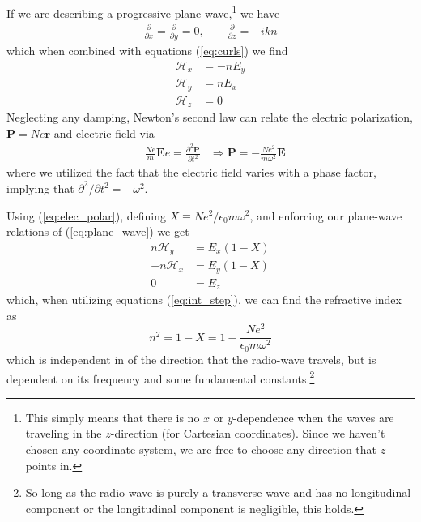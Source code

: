 \documentclass[11pt]{article}
\numberwithin{equation}{section}
\begin{document}
    If we are describing a progressive plane wave,\footnote{This simply means that there is no $x$ or $y$-dependence when the waves are traveling in the $z$-direction (for Cartesian coordinates). Since we haven't chosen any coordinate system, we are free to choose any direction that $z$ points in.} we have
    \begin{align}
         \frac{\partial}{\partial x} = \frac{\partial}{\partial y} = 0, \qquad \frac{\partial}{\partial z} = -i k n
        \label{eq:plane_wave}
    \end{align}
    which when combined with equations (\ref{eq:curls}) we find
    \begin{subequations}
     \begin{align}
        \mathcal{H}_x &= - n E_y \\
        \mathcal{H}_y & = nE_x \\
        \mathcal{H}_z & = 0
    \end{align}
    \label{eq:int_step}
    \end{subequations}
    Neglecting any damping, Newton's second law can relate the electric polarization, $\mathbf{P} = Ne\mathbf{r}$ and electric field via
    \begin{align}
         &\frac{Ne}{m}\mathbf{E}e = \frac{\partial^2 \mathbf{P}}{\partial t^2}
         &\Rightarrow \mathbf{P} = -\frac{Ne^2}{m\omega^2}\mathbf{E}
         \label{eq:elec_polar}
     \end{align} 
     where we utilized the fact that the electric field varies with a phase factor, implying that $\partial^2/\partial t^2 = -\omega^2$.\cite{budden1961radio,budden1988propagation} 

     Using (\ref{eq:elec_polar}), defining $X \equiv  N e^2/\epsilon_0m \omega^2$, and enforcing our plane-wave relations of (\ref{eq:plane_wave}) we get 
     \begin{subequations}
         \begin{align}
             n \mathcal{H}_y &= E_x(1 - X) \\
            -n \mathcal{H}_x &= E_y(1 - X) \\
            0 &= E_z
         \end{align}
     \end{subequations}
     which, when utilizing equations (\ref{eq:int_step}), we can find the refractive index as
     \begin{equation}
          n^2 = 1 - X = 1 - \frac{N e^2}{\epsilon_0 m \omega^2}
      \end{equation}
      which is independent in of the direction that the radio-wave travels, but is dependent on its frequency and some fundamental constants.\footnote{So long as the radio-wave is purely a transverse wave and has no longitudinal component or the longitudinal component is negligible, this holds.}
\end{document}
